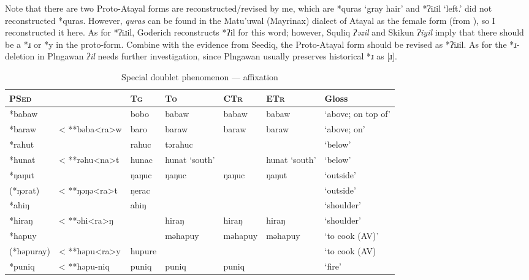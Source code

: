 \documentclass[12pt]{article}
\newcommand{\pataf}{Proto-Atayal\xspace}
\newcommand{\psed}{\textsc{PSed}\xspace}
\newcommand{\stg}{\textsc{Tg}\xspace}
\newcommand{\sto}{\textsc{To}\xspace}
\newcommand{\sctr}{\textsc{CTr}\xspace}
\newcommand{\setr}{\textsc{ETr}\xspace}
\begin{document}
Note that there are two \pataf forms are reconstructed/revised by me, which are *quras `gray hair' and *ʔiɹil `left.' \textcite{goderich2020phd} did not reconstructed *quras. However, \textit{quras} can be found in the Matu'uwal (Mayrinax) dialect of Atayal as the female form (from \cite[6]{li1983gender}), so I reconstructed it here. As for *ʔiɹil, Goderich reconstructs *ʔil for this word; however, Squliq \textit{ʔəzil} and Skikun \textit{ʔiyil} imply that there should be a *ɹ or *y in the proto-form. Combine with the evidence from Seediq, the Proto-Atayal form should be revised as *ʔiɹil. As for the *ɹ-deletion in Plngawan \textit{ʔil} needs further investigation, since Plngawan usually preserves historical *ɹ as [ɹ].

\begin{table}[!htbp]
\centering
\caption{Special doublet phenomenon --- affixation}
\label{tab:gender1}
\begin{adjustwidth}{-0.3in}{-1in}
\begin{tabular}{lllllll}
\hline
\psed    &               & \stg                         & \sto    & \sctr & \setr         & Gloss                    \\ \hline
*babaw   &               & bobo                         & babaw   & babaw & babaw         & `above; on top of'       \\
*baraw   & < **bəba<ra>w & baro                         & baraw   & baraw & baraw         & `above; on'       \\
*rahut   &               & rahuc                        & tərahuc &       &               & `below' \\
*hunat   & < **rəhu<na>t & hunac                        & hunat `south' &       & hunat `south' & `below' \\
*ŋaŋut   &               & ŋaŋuc                        & ŋaŋuc   & ŋaŋuc & ŋaŋut         & `outside'                  \\
(*ŋərat)   & < **ŋəŋə<ra>t & ŋerac                        &         &       &               & `outside'                  \\
*ahiŋ    &               & ahiŋ                         &         &       &               & `shoulder'                 \\
*hiraŋ   & < **əhi<ra>ŋ  &                              & hiraŋ   & hiraŋ & hiraŋ         & `shoulder'      \\ 
*hapuy   &               &                              & məhapuy & məhapuy & məhapuy     & `to cook (AV)'     \\
(*həpuray) & < **həpu<ra>y & hupure                       &         &       &               & `to cook (AV) \\
*puniq   & < **həpu-niq  & puniq                        & puniq   & puniq &               & `fire' \\ \hline        
\end{tabular}
\end{adjustwidth}
\end{table}
\end{document}
